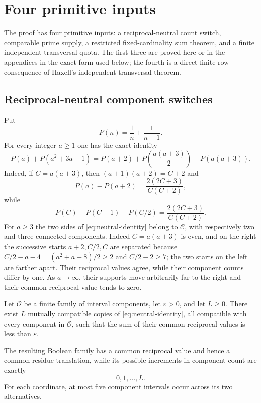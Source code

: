 \section{Four primitive inputs}
\label{sec:auxiliary-inputs}

The proof has four primitive inputs: a reciprocal-neutral count switch, comparable prime supply, a restricted fixed-cardinality sum theorem, and a finite independent-transversal quota.  The first three are proved here or in the appendices in the exact form used below; the fourth is a direct finite-row consequence of Haxell's independent-transversal theorem.

\subsection{Reciprocal-neutral component switches}

Put
\[
P(n)=\frac1n+\frac1{n+1}.
\]
For every integer $a\ge1$ one has the exact identity
\begin{equation}\label{eq:neutral-identity}
P(a)+P(a^2+3a+1)
=
P(a+2)+P\!\left(\frac{a(a+3)}2\right)+P(a(a+3)).
\end{equation}
Indeed, if $C=a(a+3)$, then $(a+1)(a+2)=C+2$ and
\[
P(a)-P(a+2)=\frac{2(2C+3)}{C(C+2)},
\]
while
\[
P(C)-P(C+1)+P(C/2)=\frac{2(2C+3)}{C(C+2)}.
\]
For $a\ge3$ the two sides of \eqref{eq:neutral-identity} belong to $\mathcal C$, with respectively two and three connected components.  Indeed $C=a(a+3)$ is even, and on the right the successive starts $a+2,C/2,C$ are separated because $C/2-a-4=(a^2+a-8)/2\ge2$ and $C/2-2\ge7$; the two starts on the left are farther apart.  Their reciprocal values agree, while their component counts differ by one.  As $a\to\infty$, their supports move arbitrarily far to the right and their common reciprocal value tends to zero.

\begin{lemma}\label{lem:neutral-cube}
Let $\mathcal O$ be a finite family of interval components, let $\varepsilon>0$, and let $L\ge0$.  There exist $L$ mutually compatible copies of \eqref{eq:neutral-identity}, all compatible with every component in $\mathcal O$, such that the sum of their common reciprocal values is less than $\varepsilon$.

The resulting Boolean family has a common reciprocal value and hence a common residue translation, while its possible increments in component count are exactly
\[
0,1,\ldots,L.
\]
For each coordinate, at most five component intervals occur across its two alternatives.
\end{lemma}

